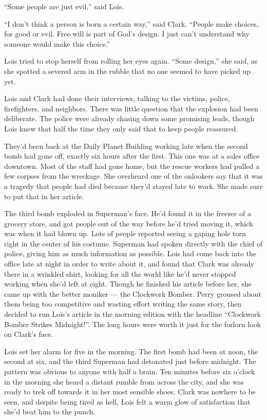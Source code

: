 ``Some people are just evil,'' said Lois.

``I don't think a person is born a certain way,'' said Clark. ``People
make choices, for good or evil. Free will is part of God's design. I
just can't understand why someone would make this choice.''

Lois tried to stop herself from rolling her eyes again. ``Some design,''
she said, as she spotted a severed arm in the rubble that no one seemed
to have picked up yet.

Lois and Clark had done their interviews, talking to the victims,
police, firefighters, and neighbors. There was little question that the
explosion had been deliberate. The police were already chasing down some
promising leads, though Lois knew that half the time they only said that
to keep people reassured.

They'd been back at the Daily Planet Building working late when the
second bomb had gone off, exactly six hours after the first. This one
was at a sales office downtown. Most of the staff had gone home, but the
rescue workers had pulled a few corpses from the wreckage. She overheard
one of the onlookers say that it was a tragedy that people had died
because they'd stayed late to work. She made sure to put that in her
article.

The third bomb exploded in Superman's face. He'd found it in the freezer
of a grocery store, and got people out of the way before he'd tried
moving it, which was when it had blown up. Lots of people reported
seeing a gaping hole torn right in the center of his costume. Superman
had spoken directly with the chief of police, giving him as much
information as possible. Lois had come back into the office late at
night in order to write about it, and found that Clark was already there
in a wrinkled shirt, looking for all the world like he'd never stopped
working when she'd left at eight. Though he finished his article before
her, she came up with the better moniker --- the Clockwork Bomber. Perry
groused about them being too competitive and wasting effort writing the
same story, then decided to run Lois's article in the morning edition
with the headline ``Clockwork Bomber Strikes Midnight!''. The long hours
were worth it just for the forlorn look on Clark's face.

Lois set her alarm for five in the morning. The first bomb had been at
noon, the second at six, and the third Superman had detonated just
before midnight. The pattern was obvious to anyone with half a brain.
Ten minutes before six o'clock in the morning she heard a distant rumble
from across the city, and she was ready to trek off towards it in her
most sensible shoes. Clark was nowhere to be seen, and despite being
tired as hell, Lois felt a warm glow of satisfaction that she'd beat him
to the punch.

